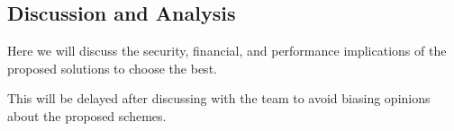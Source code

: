 \subsection{Discussion and Analysis}
\label{analysis}
Here we will discuss the security, financial, and performance implications of the 
proposed solutions to choose the best.


This will be delayed after discussing with the team to avoid biasing opinions 
about the proposed schemes.
